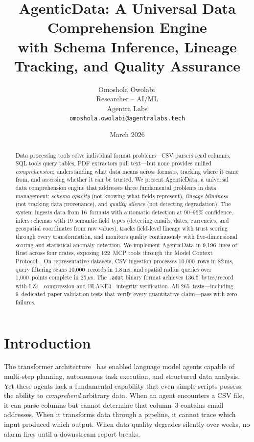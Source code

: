 \documentclass[10pt, twocolumn]{article}
\title{\textbf{AgenticData: A Universal Data Comprehension Engine\\with Schema Inference, Lineage Tracking, and Quality Assurance}}
\author{Omoshola Owolabi\,\orcidlink{0009-0006-4089-0732}\\Researcher -- AI/ML\\Agentra Labs\\\texttt{omoshola.owolabi@agentralabs.tech}}
\date{March 2026}
\begin{document}
\maketitle\thispagestyle{fancy}

\begin{abstract}
Data processing tools solve individual format problems---CSV parsers read columns, SQL tools query tables, PDF extractors pull text---but none provides unified \emph{comprehension}: understanding what data means across formats, tracking where it came from, and assessing whether it can be trusted. We present AgenticData, a universal data comprehension engine that addresses three fundamental problems in data management: \emph{schema opacity} (not knowing what fields represent), \emph{lineage blindness} (not tracking data provenance), and \emph{quality silence} (not detecting degradation). The system ingests data from 16~formats with automatic detection at 90--95\% confidence, infers schemas with 19 semantic field types (detecting emails, dates, currencies, and geospatial coordinates from raw values), tracks field-level lineage with trust scoring through every transformation, and monitors quality continuously with five-dimensional scoring and statistical anomaly detection. We implement AgenticData in 9{,}196~lines of Rust across four crates, exposing 122~MCP tools through the Model Context Protocol~\cite{mcp2024spec}. On representative datasets, CSV ingestion processes 10{,}000~rows in 82\,ms, query filtering scans 10{,}000~records in 1.8\,ms, and spatial radius queries over 1{,}000~points complete in 25\,$\mu$s. The \texttt{.adat} binary format achieves 136.5~bytes/record with LZ4~\cite{lz4_2011} compression and BLAKE3~\cite{blake3_2020} integrity verification. All 265~tests---including 9~dedicated paper validation tests that verify every quantitative claim---pass with zero failures.
\end{abstract}

\section{Introduction}\label{sec:intro}

The transformer architecture~\cite{vaswani2017attention} has enabled language model agents capable of multi-step planning, autonomous task execution, and structured data analysis. Yet these agents lack a fundamental capability that even simple scripts possess: the ability to \emph{comprehend} arbitrary data. When an agent encounters a CSV file, it can parse columns but cannot determine that column~3 contains email addresses. When it transforms data through a pipeline, it cannot trace which input produced which output. When data quality degrades silently over weeks, no alarm fires until a downstream report breaks.
\end{document}
